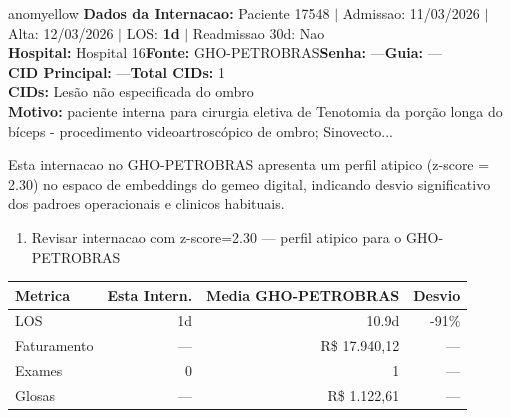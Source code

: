 \documentclass[a4paper,10pt]{article}
\begin{document}
\begin{anomalycard}[Internacao 168290 | GHO-PETROBRAS | MODERADO (z=2.30)]{anomyellow}
\textbf{Dados da Internacao:} Paciente 17548 $\mid$ Admissao: 11/03/2026 $\mid$ Alta: 12/03/2026 $\mid$ LOS: \textbf{1d} $\mid$ Readmissao 30d: Nao\\
\textbf{Hospital:} Hospital 16\quad\textbf{Fonte:} GHO-PETROBRAS\quad\textbf{Senha:} ---\quad\textbf{Guia:} ---\\
\textbf{CID Principal:} {\small ---}\quad\textbf{Total CIDs:} 1\\

\textbf{CIDs:} {\scriptsize Lesão não especificada do ombro}\\

\textbf{Motivo:} {\scriptsize paciente interna para cirurgia eletiva de Tenotomia da porção longa do bíceps - procedimento videoartroscópico de ombro; Sinovecto...}\\

\vspace{2pt}\begin{tcolorbox}[colback=severityred!20,colframe=anomyellow,title={\textbf{Interpretacao de Negocio}},fonttitle=\bfseries\small,left=4pt,right=4pt,top=3pt,bottom=3pt]
{\small Esta internacao no GHO-PETROBRAS apresenta um perfil atipico (z-score = 2.30) no espaco de embeddings do gemeo digital, indicando desvio significativo dos padroes operacionais e clinicos habituais.}
\end{tcolorbox}
\begin{tcolorbox}[colback=severityyellow!30,colframe=anomorange,title={\textbf{Recomendacoes Especificas}},fonttitle=\bfseries\small,left=4pt,right=4pt,top=3pt,bottom=3pt]
\begin{enumerate}[nosep,leftmargin=16pt]
\item {\small Revisar internacao com z-score=2.30 --- perfil atipico para o GHO-PETROBRAS}
\end{enumerate}
\end{tcolorbox}
\begin{center}\begin{tabular}{l r r r}\toprule\textbf{Metrica} & \textbf{Esta Intern.} & \textbf{Media GHO-PETROBRAS} & \textbf{Desvio} \\\midrule
LOS & 1d & 10.9d & -91\% \\
Faturamento & --- & R\$ 17.940,12 & --- \\
Exames & 0 & 1 & --- \\
Glosas & --- & R\$ 1.122,61 & --- \\
\bottomrule\end{tabular}\end{center}


\end{anomalycard}
\end{document}
